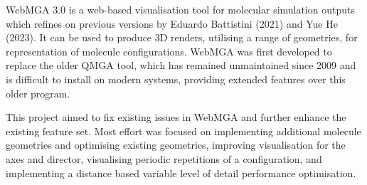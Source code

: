WebMGA 3.0 is a web-based visualisation tool for molecular simulation outputs which refines on previous versions by Eduardo Battistini (2021) and Yue He (2023). It can be used to produce 3D renders, utilising a range of geometries, for representation of molecule configurations. WebMGA was first developed to replace the older QMGA tool, which  has remained unmaintained since 2009 and is difficult to install on modern systems, providing extended features over this older program.

This project aimed to fix existing issues in WebMGA and further enhance the existing feature set. Most effort was focused on implementing additional molecule geometries and optimising existing geometries, improving visualisation for the axes and director, visualising periodic repetitions of a configuration, and implementing a distance based variable level of detail performance optimisation.
